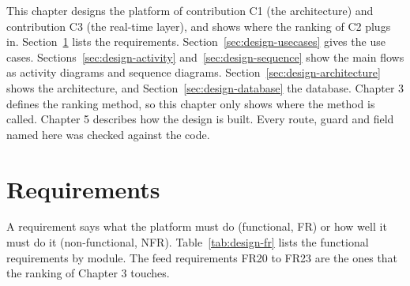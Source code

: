 
This chapter designs the platform of contribution C1 (the architecture) and contribution C3 (the real-time layer), and shows where the ranking of C2 plugs in. Section~\ref{sec:design-requirements} lists the requirements. Section~\ref{sec:design-usecases} gives the use cases. Sections~\ref{sec:design-activity} and~\ref{sec:design-sequence} show the main flows as activity diagrams and sequence diagrams. Section~\ref{sec:design-architecture} shows the architecture, and Section~\ref{sec:design-database} the database. Chapter 3 defines the ranking method, so this chapter only shows where the method is called. Chapter 5 describes how the design is built. Every route, guard and field named here was checked against the code.

\section{Requirements}
\label{sec:design-requirements}

A requirement says what the platform must do (functional, FR) or how well it must do it (non-functional, NFR). Table~\ref{tab:design-fr} lists the functional requirements by module. The feed requirements FR20 to FR23 are the ones that the ranking of Chapter 3 touches.

